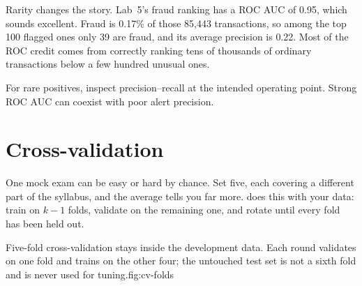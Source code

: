 Rarity changes the story. Lab~5's fraud ranking has a ROC AUC of 0.95, which sounds excellent. Fraud is 0.17\% of those 85,443 transactions, so among the top 100 flagged ones only 39 are fraud, and its average precision is 0.22. Most of the ROC credit comes from correctly ranking tens of thousands of ordinary transactions below a few hundred unusual ones.

\begin{keyidea}
For rare positives, inspect precision--recall at the intended operating point. Strong ROC AUC can coexist with poor alert precision.
\end{keyidea}

\section{Cross-validation}
\label{sec:cross-validation}

\begin{analogy}
One mock exam can be easy or hard by chance. Set five, each covering a different part of the syllabus, and the average tells you far more.  does this with your data: train on $k-1$ folds, validate on the remaining one, and rotate until every fold has been held out.
\end{analogy}

\begin{utpfig}{Five-fold cross-validation stays inside the development data. Each round validates on one fold and trains on the other four; the untouched test set is not a sixth fold and is never used for tuning.}{fig:cv-folds}
\end{utpfig}

